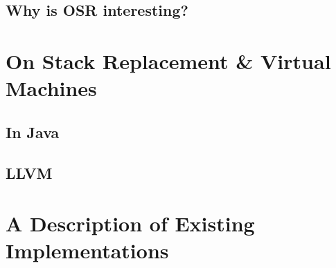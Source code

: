 \subsection{Why is OSR interesting?}


\section{On Stack Replacement \& Virtual Machines}
\subsection{In Java}

\subsection{LLVM}

\section{A Description of Existing Implementations}

